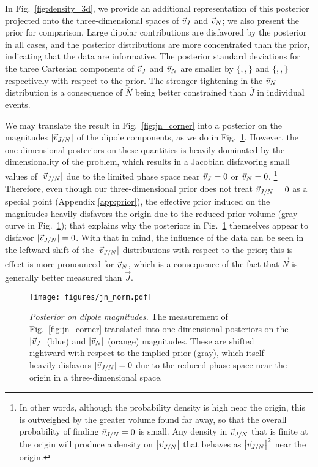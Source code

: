 \documentclass[aps,prd,twocolumn,superscriptaddress,preprintnumbers,floatfix,nofootinbib]{revtex4-2}
\newcommand{\varimpNx}{}
\newcommand{\varimpNy}{}
\newcommand{\varimpNz}{}
\newcommand{\varimpJx}{}
\newcommand{\varimpJy}{}
\newcommand{\varimpJz}{}
\begin{document}
In Fig.~\ref{fig:density_3d}, we provide an additional representation of this posterior projected onto the three-dimensional spaces of $\vec{v}_{J}$ and $\vec{v}_{N}$; we also present the prior for comparison.
Large dipolar contributions are disfavored by the posterior in all cases, and the posterior distributions are more concentrated than the prior, indicating that the data are informative.
The posterior standard deviations for the three Cartesian components of $\vec{v}_{J}$ and $\vec{v}_{N}$ are smaller by $\{\varimpJx, \varimpJy, \varimpJz\}$ and $\{\varimpNx, \varimpNy, \varimpNz\}$ respectively with respect to the prior.
The stronger tightening in the $\vec{v}_{N}$ distribution is a consequence of $\hat{N}$ being better constrained than $\hat{J}$ in individual events.


We may translate the result in Fig.~\ref{fig:jn_corner} into a posterior on the magnitudes $|\vec{v}_{J/N}|$ of the dipole components, as we do in Fig.~\ref{fig:jn_norm}.
However, the one-dimensional posteriors on these quantities is heavily dominated by the dimensionality of the problem, which results in a Jacobian disfavoring small values of $|\vec{v}_{J/N}|$ due to the limited phase space near $\vec{v}_{J}=0$ or $\vec{v}_{N} = 0$.%
\footnote{In other words, although the probability density is high near the origin, this is outweighed by the greater volume found far away, so that the overall probability of finding $\vec{v}_{J/N}=0$ is small.  Any density in $\vec{v}_{J/N}$ that is finite at the origin will produce a density on $\left| \vec{v}_{J/N} \right|$ that behaves as $\left| \vec{v}_{J/N} \right|^2$ near the origin.}
Therefore, even though our three-dimensional prior does not treat $\vec{v}_{J/N} = 0$ as a special point (Appendix \ref{app:prior}), the effective prior induced on the magnitudes heavily disfavors the origin due to the reduced prior volume (gray curve in Fig.~\ref{fig:jn_norm}); that explains why the posteriors in Fig.~\ref{fig:jn_norm} themselves appear to disfavor $|\vec{v}_{J/N}| = 0$.
With that in mind, the influence of the data can be seen in the leftward shift of the $|\vec{v}_{J/N}|$ distributions with respect to the prior; this is effect is more pronounced for $\vec{v}_{N}$, which is a consequence of the fact that $\vec{N}$ is generally better measured than $\vec{J}$.

\begin{figure}
\texttt{[image: figures/jn\_norm.pdf]}
\caption{\emph{Posterior on dipole magnitudes.} The measurement of Fig.~\ref{fig:jn_corner} translated into one-dimensional posteriors on the $|\vec{v}_{J}|$ (blue) and $|\vec{v}_{N}|$ (orange) magnitudes.
These are shifted rightward with respect to the implied prior (gray), which itself heavily disfavors $|\vec{v}_{J/N}|=0$ due to the reduced phase space near the origin in a three-dimensional space.
}
\label{fig:jn_norm}
\end{figure}
\end{document}
